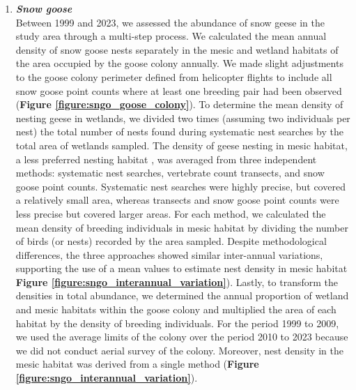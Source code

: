 \documentclass[a4paper,twoside,12pt]{article}
\begin{document}
\begin{enumerate}[label=\alph*.]
      \item[] \textit{\textbf{Snow goose}}\\
       Between 1999 and 2023, we assessed the abundance of snow geese in the study area through a multi-step process. We calculated the mean annual density of snow goose nests separately in the mesic and wetland habitats of the area occupied by the goose colony annually. We made slight adjustments to the goose colony perimeter defined from helicopter flights to include all snow goose point counts where at least one breeding pair had been observed (\textbf{Figure \ref{figure:sngo_goose_colony}}). To determine the mean density of nesting geese in wetlands, we divided two times (assuming two individuals per nest) the total number of nests found during systematic nest searches by the total area of wetlands sampled. The density of geese nesting in mesic habitat, a less preferred nesting habitat \citep{lecomte2008}, was averaged from three independent methods: systematic nest searches, vertebrate count transects, and snow goose point counts. Systematic nest searches were highly precise, but covered a relatively small area, whereas transects and snow goose point counts were less precise but covered larger areas. For each method, we calculated the mean density of breeding individuals in mesic habitat by dividing the number of birds (or nests) recorded by the area sampled. Despite methodological differences, the three approaches showed similar inter-annual variations, supporting the use of a mean values to estimate nest density in mesic habitat \textbf{Figure \ref{figure:sngo_interannual_variation}}). Lastly, to transform the densities in total abundance, we determined the annual proportion of wetland and mesic habitats within the goose colony and multiplied the area of each habitat by the density of breeding individuals. For the period 1999 to 2009, we used the average limits of the colony over the period 2010 to 2023 because we did not conduct aerial survey of the colony. Moreover, nest density in the mesic habitat was derived from a single method (\textbf{Figure \ref{figure:sngo_interannual_variation}}). 
                        

\end{enumerate}
\end{document}
